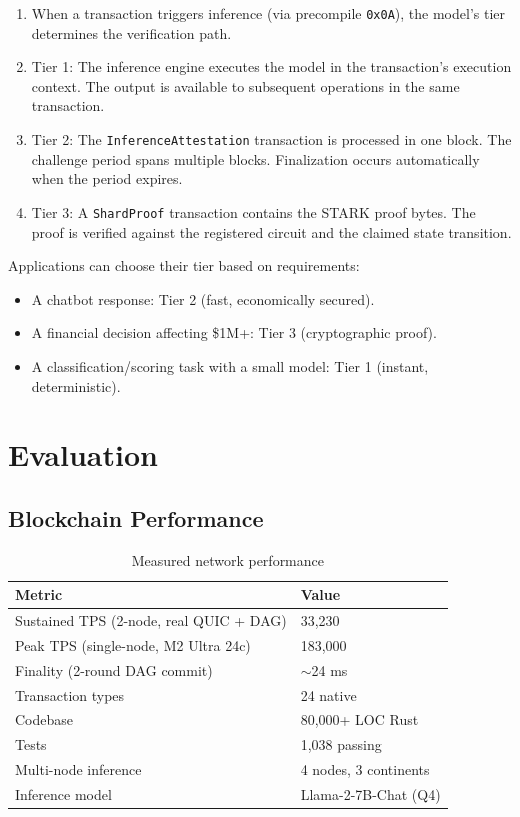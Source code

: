 \documentclass[conference]{IEEEtran}
\begin{document}
\begin{enumerate}
    \item When a transaction triggers inference (via precompile \texttt{0x0A}), the model's tier determines the verification path.
    \item Tier 1: The inference engine executes the model in the transaction's execution context. The output is available to subsequent operations in the same transaction.
    \item Tier 2: The \texttt{InferenceAttestation} transaction is processed in one block. The challenge period spans multiple blocks. Finalization occurs automatically when the period expires.
    \item Tier 3: A \texttt{ShardProof} transaction contains the STARK proof bytes. The proof is verified against the registered circuit and the claimed state transition.
\end{enumerate}

Applications can choose their tier based on requirements:
\begin{itemize}
    \item A chatbot response: Tier 2 (fast, economically secured).
    \item A financial decision affecting \$1M+: Tier 3 (cryptographic proof).
    \item A classification/scoring task with a small model: Tier 1 (instant, deterministic).
\end{itemize}

\section{Evaluation}

\subsection{Blockchain Performance}

\begin{table}[h]
\caption{Measured network performance}
\label{tab:perf}
\centering
\begin{tabular}{ll}
\toprule
Metric & Value \\
\midrule
Sustained TPS (2-node, real QUIC + DAG) & 33,230 \\
Peak TPS (single-node, M2 Ultra 24c) & 183,000 \\
Finality (2-round DAG commit) & $\sim$24 ms \\
Transaction types & 24 native \\
Codebase & 80,000+ LOC Rust \\
Tests & 1,038 passing \\
Multi-node inference & 4 nodes, 3 continents \\
Inference model & Llama-2-7B-Chat (Q4) \\
\bottomrule
\end{tabular}
\end{table}
\end{document}
